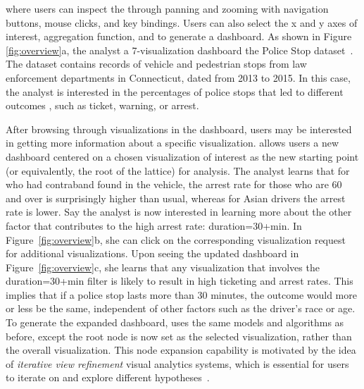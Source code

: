 where users can inspect the  
through panning and zooming with navigation buttons, 
mouse clicks, and key bindings. 
Users can also select the x and y axes of interest, 
aggregation function, and  
to generate a dashboard. 
As shown in Figure \ref{fig:overview}a, the analyst  a 7-visualization dashboard  the Police Stop dataset~\cite{police}. The dataset contains records of vehicle and pedestrian stops from law enforcement departments in Connecticut, dated from 2013 to 2015. In this case, the analyst is interested in the percentages of police stops  that led to different outcomes , such as ticket, warning, or arrest.
\par After browsing through visualizations in the dashboard, users may be interested in getting more information about a specific visualization. \system allows users  a new dashboard centered on a chosen visualization of interest as the new starting point (or equivalently, the root of the lattice) for analysis. The analyst learns that for  who had contraband found in the vehicle, the arrest rate for those who are 60 and over is surprisingly higher than usual, whereas for Asian drivers the arrest rate is lower. Say the analyst is now interested in learning more about the other factor that contributes to the high arrest rate: duration=30+min. In Figure~\ref{fig:overview}b, she can click on the corresponding visualization  request for additional visualizations. Upon seeing the updated dashboard in Figure~\ref{fig:overview}c, she learns that any visualization that involves the duration=30+min filter is likely to result in high ticketing and arrest rates. This implies that if a police stop lasts more than 30 minutes, the outcome would more or less be the same, independent of other factors such as the driver's race or age. To generate the expanded dashboard, \system uses the same models and algorithms as before, except the root node is now set as the selected visualization, rather than the overall visualization. This node expansion capability is motivated by the idea of \textit{iterative view refinement}  visual analytics systems, which is essential for users to iterate on and explore different hypotheses~\cite{Hoque2017,Wongsuphasawat2016}.

